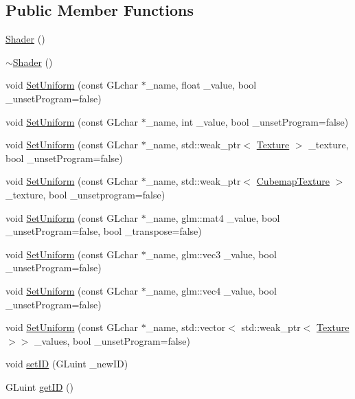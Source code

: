 \subsection*{Public Member Functions}
\begin{DoxyCompactItemize}
\item 
\hyperlink{classfrontier_1_1_shader_ab428b55b218efdedc1dc6445e43a286f}{Shader} ()
\item 
\hyperlink{classfrontier_1_1_shader_a447710cc5dee2e490e64d86201b114d7}{$\sim$\+Shader} ()
\item 
void \hyperlink{classfrontier_1_1_shader_ae893f9f790c70ef2abaa0f1ba58bfec1}{Set\+Uniform} (const G\+Lchar $\ast$\+\_\+name, float \+\_\+value, bool \+\_\+unset\+Program=false)
\item 
void \hyperlink{classfrontier_1_1_shader_ae11b17bf3cc75186024f9a058cf06cb7}{Set\+Uniform} (const G\+Lchar $\ast$\+\_\+name, int \+\_\+value, bool \+\_\+unset\+Program=false)
\item 
void \hyperlink{classfrontier_1_1_shader_ad9bb90b3f092c6925293cee5013c9400}{Set\+Uniform} (const G\+Lchar $\ast$\+\_\+name, std\+::weak\+\_\+ptr$<$ \hyperlink{classfrontier_1_1_texture}{Texture} $>$ \+\_\+texture, bool \+\_\+unset\+Program=false)
\item 
void \hyperlink{classfrontier_1_1_shader_a801d8cdbe9d924c601fddcdf9744c0d3}{Set\+Uniform} (const G\+Lchar $\ast$\+\_\+name, std\+::weak\+\_\+ptr$<$ \hyperlink{classfrontier_1_1_cubemap_texture}{Cubemap\+Texture} $>$ \+\_\+texture, bool \+\_\+unsetprogram=false)
\item 
void \hyperlink{classfrontier_1_1_shader_adebc3dfdc6b24535ed01cfc5a8f69867}{Set\+Uniform} (const G\+Lchar $\ast$\+\_\+name, glm\+::mat4 \+\_\+value, bool \+\_\+unset\+Program=false, bool \+\_\+transpose=false)
\item 
void \hyperlink{classfrontier_1_1_shader_aad5527a4747c3dc7692a8cdaede42537}{Set\+Uniform} (const G\+Lchar $\ast$\+\_\+name, glm\+::vec3 \+\_\+value, bool \+\_\+unset\+Program=false)
\item 
void \hyperlink{classfrontier_1_1_shader_a2f1cc89390360779c0df68f2d10efff1}{Set\+Uniform} (const G\+Lchar $\ast$\+\_\+name, glm\+::vec4 \+\_\+value, bool \+\_\+unset\+Program=false)
\item 
void \hyperlink{classfrontier_1_1_shader_ac2c00404227e37fa33d031b6725d79fb}{Set\+Uniform} (const G\+Lchar $\ast$\+\_\+name, std\+::vector$<$ std\+::weak\+\_\+ptr$<$ \hyperlink{classfrontier_1_1_texture}{Texture} $>$$>$ \+\_\+values, bool \+\_\+unset\+Program=false)
\item 
void \hyperlink{classfrontier_1_1_shader_a0dd496d4f828826d25ece1c02274625e}{set\+ID} (G\+Luint \+\_\+new\+ID)
\item 
G\+Luint \hyperlink{classfrontier_1_1_shader_a85d4e81088393b8cdfcd8d329ad23909}{get\+ID} ()
\end{DoxyCompactItemize}
